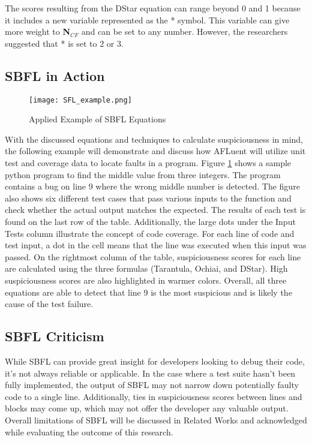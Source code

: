 The scores resulting from the DStar equation can range beyond 0 and 1 because it includes
a new variable represented as the * symbol. This variable can give more
weight to \textbf{N$_{CF}$} and can be set to any number. However, the
researchers suggested that * is set to 2 or 3.

\subsection{SBFL in Action}
\label{subsec:SBFLinAction}

\begin{figure}[!htb]
	\begin{center}
		\texttt{[image: SFL\_example.png]}
		\caption{\label{fig:sbfl_example} Applied Example of SBFL Equations}
	\end{center}
\end{figure}

With the discussed equations and techniques to calculate suspiciousness in mind,
the following example will demonstrate and discuss how AFLuent will utilize unit
test and coverage data to locate faults in a program.
Figure \ref{fig:sbfl_example}
shows a sample python program to find the middle value
from three integers. The program contains a bug on line 9 where the wrong middle
number is detected. The figure also shows six different test cases that pass
various inputs to the function and check whether the actual output matches the
expected. The results of each test is found on the last row of the table.
Additionally, the large dots under the Input Tests column illustrate the concept
of code coverage. For each line of code and test input, a dot in the cell means
that the line was executed when this input was passed. On the rightmost column
of the table, suspiciousness scores for each line are calculated using the three
formulas (Tarantula, Ochiai, and DStar). High suspiciousness scores are also
highlighted in warmer colors. Overall, all three equations are able to detect
that line 9 is the most suspicious and is likely the cause of the test failure.

\subsection{SBFL Criticism}
\label{subsec:Criticism}

While SBFL can provide great insight for developers looking to debug their code,
it's not always reliable or applicable. In the case where a test suite hasn't
been fully implemented, the output of SBFL may not narrow down potentially faulty
code to a single line. Additionally, ties in suspiciousness scores between lines
and blocks may come up, which may not offer the developer any valuable output.
Overall limitations of SBFL will be discussed in Related Works and acknowledged
while evaluating the outcome of this research.

